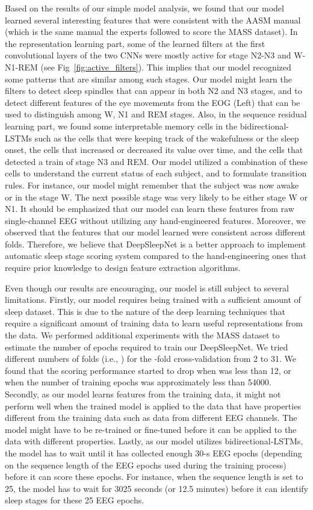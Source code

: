 \documentclass[journal,twoside]{IEEEtran}
\begin{document}
Based on the results of our simple model analysis, we found that our model learned several interesting features that were consistent with the AASM manual (which is the same manual the experts followed to score the MASS dataset). In the representation learning part, some of the learned filters at the first convolutional layers of the two CNNs were mostly active for stage N2-N3 and W-N1-REM (see Fig~\ref{fig:active_filters}). This implies that our model recognized some patterns that are similar among such stages. Our model might learn the filters to detect sleep spindles that can appear in both N2 and N3 stages, and to detect different features of the eye movements from the EOG (Left) that can be used to distinguish among W, N1 and REM stages. Also, in the sequence residual learning part, we found some interpretable memory cells in the bidirectional-LSTMs such as the cells that were keeping track of the wakefulness or the sleep onset, the cells that increased or decreased its value over time, and the cells that detected a train of stage N3 and REM. Our model utilized a combination of these cells to understand the current status of each subject, and to formulate transition rules. For instance, our model might remember that the subject was now awake or in the stage W. The next possible stage was very likely to be either stage W or N1. It should be emphasized that our model can learn these features from raw single-channel EEG without utilizing any hand-engineered features. Moreover, we observed that the features that our model learned were consistent across different folds. Therefore, we believe that DeepSleepNet is a better approach to implement automatic sleep stage scoring system compared to the hand-engineering ones that require prior knowledge to design feature extraction algorithms.

Even though our results are encouraging, our model is still subject to several limitations. Firstly, our model requires being trained with a sufficient amount of sleep dataset. This is due to the nature of the deep learning techniques that require a significant amount of training data to learn useful representations from the data.
We performed additional experiments with the MASS dataset to estimate the number of epochs required to train our DeepSleepNet. We tried different numbers of folds (i.e., ) for the -fold cross-validation from 2 to 31. We found that the scoring performance started to drop when  was less than 12, or when the number of training epochs was approximately less than 54000.
Secondly, as our model learns features from the training data, it might not perform well when the trained model is applied to the data that have properties different from the training data such as data from different EEG channels.
The model might have to be re-trained or fine-tuned before it can be applied to the data with different properties.
Lastly, as our model utilizes bidirectional-LSTMs, the model has to wait until it has collected enough 30-s EEG epochs (depending on the sequence length of the EEG epochs used during the training process) before it can score these epochs. For instance, when the sequence length is set to 25, the model has to wait for 3025 seconds (or 12.5 minutes) before it can identify sleep stages for these 25 EEG epochs.
\end{document}

